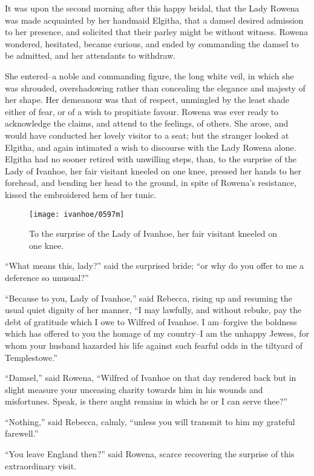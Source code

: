 It was upon the second morning after this happy bridal, that the Lady
Rowena was made acquainted by her handmaid Elgitha, that a damsel
desired admission to her presence, and solicited that their parley might
be without witness. Rowena wondered, hesitated, became curious, and
ended by commanding the damsel to be admitted, and her attendants to
withdraw.

She entered--a noble and commanding figure, the long white veil, in
which she was shrouded, overshadowing rather than concealing the
elegance and majesty of her shape. Her demeanour was that of respect,
unmingled by the least shade either of fear, or of a wish to propitiate
favour. Rowena was ever ready to acknowledge the claims, and attend to
the feelings, of others. She arose, and would have conducted her lovely
visitor to a seat; but the stranger looked at Elgitha, and again
intimated a wish to discourse with the Lady Rowena alone. Elgitha had no
sooner retired with unwilling steps, than, to the surprise of the Lady
of Ivanhoe, her fair visitant kneeled on one knee, pressed her hands to
her forehead, and bending her head to the ground, in spite of Rowena's
resistance, kissed the embroidered hem of her tunic.

\begin{figure}
    \centering
    \texttt{[image: ivanhoe/0597m]}
    \caption{To the surprise of the Lady of Ivanhoe, her fair visitant
    kneeled on one knee.}
\end{figure}

``What means this, lady?'' said the surprised bride; ``or why do you
offer to me a deference so unusual?''

``Because to you, Lady of Ivanhoe,'' said Rebecca, rising up and
resuming the usual quiet dignity of her manner, ``I may lawfully, and
without rebuke, pay the debt of gratitude which I owe to Wilfred of
Ivanhoe. I am--forgive the boldness which has offered to you the homage
of my country--I am the unhappy Jewess, for whom your husband hazarded
his life against such fearful odds in the tiltyard of Templestowe.''

``Damsel,'' said Rowena, ``Wilfred of Ivanhoe on that day rendered back
but in slight measure your unceasing charity towards him in his wounds
and misfortunes. Speak, is there aught remains in which he or I can
serve thee?''

``Nothing,'' said Rebecca, calmly, ``unless you will transmit to him my
grateful farewell.''

``You leave England then?'' said Rowena, scarce recovering the surprise
of this extraordinary visit.

